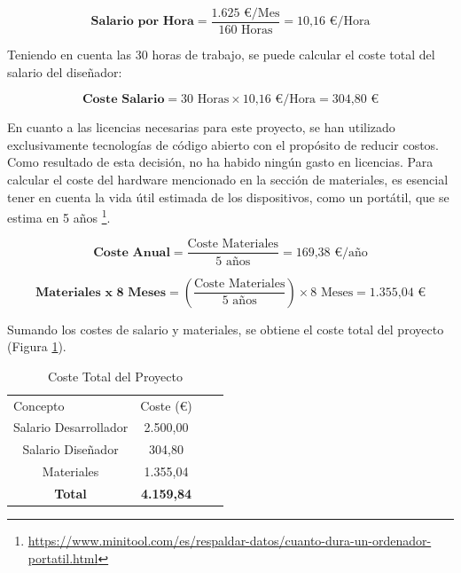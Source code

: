 \begin{equation}
    \textbf{Salario por Hora} = \frac {\text{1.625 €/Mes}}{160 \text{ Horas}} = \text{10,16 €/Hora}
\end{equation}

Teniendo en cuenta las 30 horas de trabajo, se puede calcular el coste total del salario del diseñador:

\begin{equation}
    \textbf{Coste Salario} = \text{30 Horas} \times \text{10,16 €/Hora} = \text{304,80 €}
\end{equation}

En cuanto a las licencias necesarias para este proyecto, se han utilizado exclusivamente tecnologías de código abierto con el propósito de reducir costos. Como resultado de esta decisión, no ha habido ningún gasto en licencias. Para calcular el coste del hardware mencionado en la sección de materiales, es esencial tener en cuenta la vida útil estimada de los dispositivos, como un portátil, que se estima en 5 años \footnote{\url{https://www.minitool.com/es/respaldar-datos/cuanto-dura-un-ordenador-portatil.html}}.

\begin{equation}
    \textbf{Coste Anual} = \frac {\text{Coste Materiales}}{\text{5 años}} = \text{169,38 €/año}
\end{equation}

\begin{equation}
    \textbf{Materiales x 8 Meses} = \left(\frac {\text{Coste Materiales}}{\text{5 años}}\right) \times 8 \text{ Meses} = \text{1.355,04 €}
\end{equation}

Sumando los costes de salario y materiales, se obtiene el coste total del proyecto (Figura \ref{tab:coste_total}).

\begin{table}[H]
    \centering
    \begin{tabular}{|c|c|ll}
    \cline{1-2}
    \multicolumn{1}{|l|}{Concepto} & \multicolumn{1}{l|}{Coste (€)} &  &  \\ \cline{1-2}
    Salario Desarrollador           & 2.500,00                        &  &  \\ \cline{1-2}
    Salario Diseñador               & 304,80                         &  &  \\ \cline{1-2}
    Materiales                      & 1.355,04                       &  &  \\ \cline{1-2}
    \textbf{Total}                   & \textbf{4.159,84}               &  &  \\ \cline{1-2}
    \end{tabular}
    \caption{Coste Total del Proyecto}
    \label{tab:coste_total}
\end{table}
